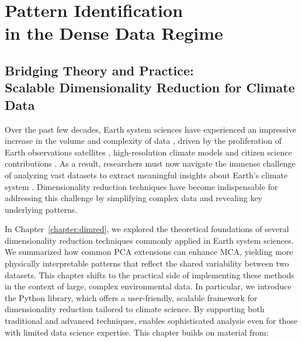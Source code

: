 
\ifpdf
    \graphicspath{{content/chapter5/figs/raster/}{content/chapter5/figs/}}
\else
    \graphicspath{{content/chapter5/figs/vector/}{content/chapter5/figs/}}
\fi


\part[Pattern Identification in the Dense Data Regime]{Pattern Identification\\in the Dense Data Regime}\label{part:dense_data}

\chapter[Bridging Theory and Practice: Scalable Dimensionality Reduction for Climate Data]{Bridging Theory and Practice:\\Scalable Dimensionality Reduction for Climate Data}\label{chapter:xeofs}


Over the past few decades, Earth system sciences have experienced an impressive increase in the volume and complexity of data \cite{overpeck_climate_2011}, driven by the proliferation of Earth observations satellites \cite{gomes_overview_2020}, high-resolution climate models \cite{hassani_big_2019} and citizen science contributions \cite{fritz_role_2017}. As a result, researchers must now navigate the immense challenge of analyzing vast datasets to extract meaningful insights about Earth's climate system \cite{schnase_big_2016}. Dimensionality reduction techniques have become indispensable for addressing this challenge by simplifying complex data and revealing key underlying patterns.

In Chapter~\ref{chapter:dimred}, we explored the theoretical foundations of several dimensionality reduction techniques commonly applied in Earth system sciences. We summarized how common PCA extensions can enhance MCA, yielding more physically interpretable patterns that reflect the shared variability between two datasets. This chapter shifts to the practical side of implementing these methods in the context of large, complex environmental data. In particular, we introduce the  Python library, which offers a user-friendly, scalable framework for dimensionality reduction tailored to climate science. By supporting both traditional and advanced techniques,  enables sophisticated analysis even for those with limited data science expertise. This chapter builds on material from:

